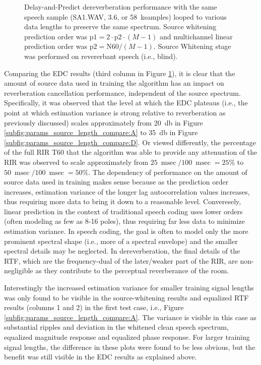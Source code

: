 \begin{figure}[H]
	\caption{Delay-and-Predict dereverberation performance with the same speech sample (SA1.WAV, \qty{3.6}{\sec}, or \qty{58}{\kilo samples}) looped to various data lengths to preserve the same spectrum. Source whitening prediction order was $\mathrm{p1} = 2 \cdot \mathrm{p2} \cdot (M-1)$ and multichannel linear prediction order was $\mathrm{p2} = \mathrm{N60} / (M-1)$. Source Whitening stage was performed on revererbant speech (i.e., blind).}
	\label{fig:params_source_length_compare}
	
\end{figure}

Comparing the EDC results (third column in Figure \ref{fig:params_source_length_compare}), it is clear that the amount of source data used in training the algorithm has an impact on reverberation cancellation performance, independent of the source spectrum. Specifically, it was observed that the level at which the EDC plateaus (i.e., the point at which estimation variance is strong relative to reverberation as previously discussed) scales approximately from \qty{20}{\decibel} in Figure \ref{subfig:params_source_length_compare:A} to \qty{35}{\decibel} in Figure \ref{subfig:params_source_length_compare:D}. Or viewed differently, the percentage of the full RIR T60 that the algorithm was able to provide any attenuation of the RIR was observed to scale approximately from $\qty{25}{\milli\sec} / \qty{100}{\milli\sec}=25 \%$ to $\qty{50}{\milli\sec} / \qty{100}{\milli\sec}=50 \%$. The dependency of performance on the amount of source data used in training makes sense because as the prediction order increases, estimation variance of the longer lag autocorrelation values increases, thus requiring more data to bring it down to a reasonable level. Converesely, linear prediction in the context of traditional speech coding uses lower orders (often modeling as few as 8-16 poles), thus requiring far less data to minimize estimation variance. In speech coding, the goal is often to model only the more prominent spectral shape (i.e., more of a spectral envelope) and the smaller spectral details may be neglected. In dereverberation, the final details of the RTF, which are the frequency-dual of the later/weaker part of the RIR, are non-negligible as they contribute to the perceptual reverberance of the room. 

Interestingly the increased estimation variance for smaller training signal lengths was only found to be visible in the source-whitening results and equalized RTF results (columns 1 and 2) in the first test case, i.e., Figure \ref{subfig:params_source_length_compare:A}. The variance is visible in this case as substantial ripples and deviation in the whitened clean speech spectrum, equalized magnitude response and equalized phase response. For larger training signal lengths, the difference in these plots were found to be less obvious, but the benefit was still visible in the EDC results as explained above.

